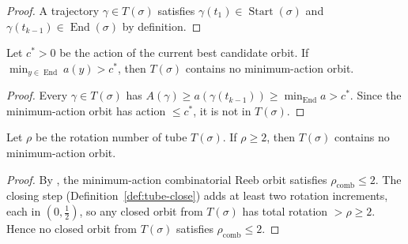 \begin{proof}
A trajectory $\gamma \in T(\sigma)$ satisfies
$\gamma(t_1) \in \operatorname{Start}(\sigma)$ and
$\gamma(t_{k-1}) \in \operatorname{End}(\sigma)$ by definition.
\end{proof}

\begin{lemma}\label{lem:prune-action}
Let $c^* > 0$ be the action of the current best candidate orbit.
If $\min_{y \in \operatorname{End}} a(y) > c^*$,
then $T(\sigma)$ contains no minimum-action orbit.
\end{lemma}

\begin{proof}
Every $\gamma \in T(\sigma)$ has
$A(\gamma) \geq a(\gamma(t_{k-1})) \geq \min_{\operatorname{End}} a > c^*$.
Since the minimum-action orbit has action $\leq c^*$, it is not in $T(\sigma)$.
\end{proof}

\begin{lemma}\label{lem:prune-rotation}
Let $\rho$ be the rotation number of tube $T(\sigma)$.
If $\rho \geq 2$, then $T(\sigma)$ contains no minimum-action orbit.
\end{lemma}

\begin{proof}
By \cite[Cor.~1.15]{CH2021}, the minimum-action combinatorial Reeb orbit
satisfies $\rho_{\mathrm{comb}} \leq 2$.
The closing step (Definition~\ref{def:tube-close}) adds at least two
rotation increments, each in $(0, \tfrac{1}{2})$,
so any closed orbit from $T(\sigma)$ has total rotation
$> \rho \geq 2$.
Hence no closed orbit from $T(\sigma)$ satisfies $\rho_{\mathrm{comb}} \leq 2$.
\end{proof}

